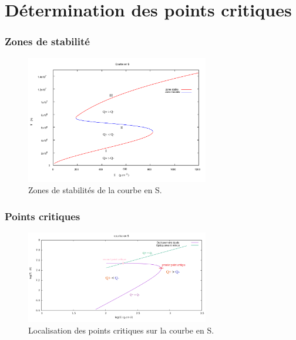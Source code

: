 \documentclass[french]{beamer}
\begin{document}

\section{Détermination des points critiques}
\begin{frame}
\frametitle{Zones de stabilité}

   \begin{figure}[htb!]
      \includegraphics[width=8cm]{figures/stable.pdf}
      \caption{Zones de stabilités de la courbe en S.}
    \end{figure}
\end{frame}

\begin{frame}		
\frametitle{Points critiques}		
		
   \begin{figure}[htb!]		
      \includegraphics[width=8cm]{figures/points_critiques.png}		
      \caption{Localisation des points critiques sur la courbe en S.}		
    \end{figure}		
\end{frame}		


\end{document}
